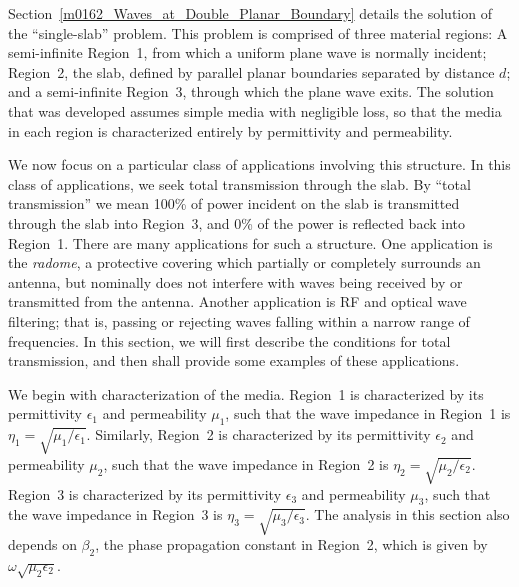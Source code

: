 

\label{m0163_Total_Transmission_Slab} %

Section~\ref{m0162_Waves_at_Double_Planar_Boundary} details the solution of the ``single-slab'' problem.
This problem is comprised of three material regions: 
A semi-infinite Region~1, from which a uniform plane wave is normally incident;
Region~2, the slab, defined by parallel planar boundaries separated by distance $d$; and
a semi-infinite Region~3, through which the plane wave exits.
The solution that was developed assumes simple media with negligible loss, so that the media in each region is characterized entirely by permittivity and permeability.

We now focus on a particular class of applications involving this structure.  
In this class of applications, we seek total transmission through the slab.
By ``total transmission'' we mean 100\% of power incident on the slab is transmitted through the slab into Region~3, and 0\% of the power is reflected back into Region~1.
There are many applications for such a structure.
One application is the {\it radome},
a protective covering which partially or completely surrounds an antenna, but nominally does not interfere with waves being received by or transmitted from the antenna.  
Another application is RF and optical wave filtering; that is, passing or rejecting waves falling within a narrow range of frequencies.  
In this section, we will first describe the conditions for total transmission, and then shall provide some examples of these applications.

We begin with characterization of the media.  
Region~1 is characterized by its permittivity $\epsilon_1$ and permeability $\mu_1$, such that the wave impedance in Region~1 is $\eta_1=\sqrt{\mu_1/\epsilon_1}$.
Similarly, 
Region~2 is characterized by its permittivity $\epsilon_2$ and permeability $\mu_2$, such that the wave impedance in Region~2 is $\eta_2=\sqrt{\mu_2/\epsilon_2}$.
Region~3 is characterized by its permittivity $\epsilon_3$ and permeability $\mu_3$, such that the wave impedance in Region~3 is $\eta_3=\sqrt{\mu_3/\epsilon_3}$. 
The analysis in this section also depends on $\beta_2$, the phase propagation constant in Region~2, which is given by $\omega\sqrt{\mu_2\epsilon_2}$.

